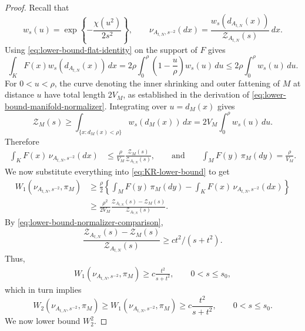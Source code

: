 \documentclass{article}
\numberwithin{equation}{section}
\begin{document}
\begin{proof}
Recall that
\[
 w_s(u)=\exp\left\{-\frac{\chi(u^2)}{2s^2}\right\},
 \qquad
 \nu_{A_{t,N},s^{-2}}(dx)
 =\frac{w_s(d_{A_{t,N}}(x))}{\mathcal Z_{A_{t,N}}(s)}\,dx.
\]
Using \eqref{eq:lower-bound-flat-identity} on the support of $F$ gives
\[
 \int_K F(x)w_s(d_{A_{t,N}}(x))\,dx
 =2\rho\int_0^\rho
   \left(1-\frac{u}{\rho}\right)w_s(u)\,du
 \le2\rho\int_0^\rho w_s(u)\,du.
\]
For $0<u<\rho$, the curve denoting the inner shrinking and outer fattening of $M$ at distance $u$
have total length $2V_M$, as established in the derivation of
\eqref{eq:lower-bound-manifold-normalizer}. Integrating over $u=d_M(x)$ gives
\[
 \mathcal Z_M(s)
 \ge \int_{\{x:d_M(x)<\rho\}}w_s(d_M(x))\,dx
 =2V_M\int_0^\rho w_s(u)\,du.
\]
Therefore
\begin{align*}
 \int_K F(x)\,\nu_{A_{t,N},s^{-2}}(dx)
 &\le \frac{\rho}{V_M}
       \frac{\mathcal Z_M(s)}{\mathcal Z_{A_{t,N}}(s)},\qquad \text{and}\qquad 
 \int_M F(y)\,\pi_M(dy)=\frac{\rho}{V_M}.
\end{align*}
We now substitute everything into \eqref{eq:KR-lower-bound} to get
\begin{align*}
 W_1(\nu_{A_{t,N},s^{-2}},\pi_M)
 &\ge \frac{\rho}{2}
 \left\{
 \int_M F(y)\,\pi_M(dy)
 -\int_K F(x)\,\nu_{A_{t,N},s^{-2}}(dx)
 \right\}\\
 &\ge\frac{\rho^2}{2V_M}
 \frac{\mathcal Z_{A_{t,N}}(s)-\mathcal Z_M(s)}
 {\mathcal Z_{A_{t,N}}(s)}.
\end{align*}
By \eqref{eq:lower-bound-normalizer-comparison},  $$\frac{\mathcal Z_{A_{t,N}}(s)-\mathcal Z_M(s)}
 {\mathcal Z_{A_{t,N}}(s)}\geq ct^2/(s+t^2).$$ Thus,
 \begin{align*}
   W_1(\nu_{A_{t,N},s^{-2}},\pi_M)
 \ge c\frac{t^2}{s+t^2},
 \qquad 0<s\le s_0,
 \end{align*}
 which in turn implies
\begin{equation}
 W_2(\nu_{A_{t,N},s^{-2}},\pi_M)
 \ge W_1(\nu_{A_{t,N},s^{-2}},\pi_M)
 \ge c\frac{t^2}{s+t^2},
 \qquad 0<s\le s_0.
\label{eq:lower-bound-tangential-deficit}
\end{equation}
We now lower bound $W_2^2$.


\end{proof}
\end{document}
